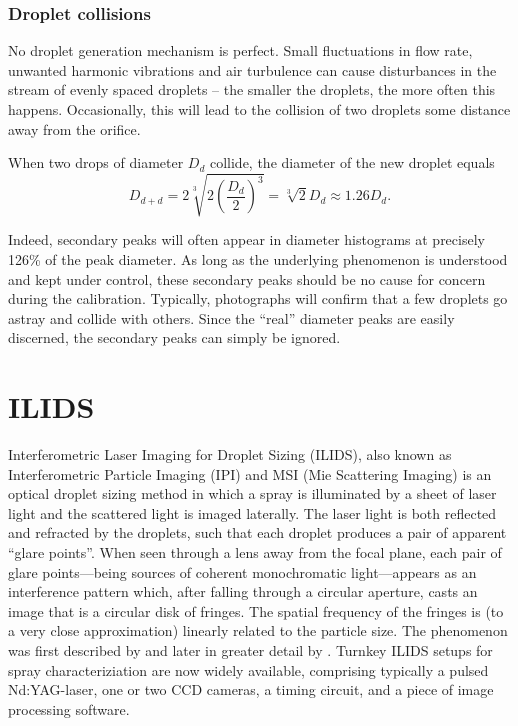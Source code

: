 \documentclass[11.5pt,oneside]{book}
\begin{document}
\subsection{Droplet collisions}
\label{sec:droplet-collisions}
No droplet generation mechanism is perfect. Small fluctuations in flow rate,
unwanted harmonic vibrations and air turbulence can cause disturbances in the
stream of evenly spaced droplets -- the smaller the droplets, the more often
this happens. Occasionally, this will lead to the collision
of two droplets some distance away from the orifice.

When two drops of diameter $D_d$ collide, the diameter of the new droplet equals
\begin{equation}
    D_{d+d} = 2\sqrt[3]{2\left(\frac{D_d}{2}\right)^3} = \sqrt[3]{2} D_d \approx
    1.26 D_d.
\end{equation}

Indeed, secondary peaks will often appear in diameter histograms at precisely 126\% of
the peak diameter. As long as the underlying phenomenon is understood and kept
under control, these secondary peaks should be no cause for concern during the
calibration. Typically, photographs will confirm that a few droplets go astray
and collide with others. Since the ``real'' diameter peaks are easily discerned,
the secondary peaks can simply be ignored.

\chapter[ILIDS]{ILIDS}
Interferometric Laser Imaging for Droplet Sizing (ILIDS), also known as
Interferometric Particle Imaging (IPI) and MSI (Mie Scattering Imaging) is an
optical droplet sizing method in which a spray is illuminated by a sheet of
laser light and the scattered light is imaged laterally. The laser light is both
reflected and refracted by the droplets, such that each droplet produces a pair
of apparent ``glare points''. When seen through a lens away from the focal
plane, each pair of glare points---being sources of coherent monochromatic
light---appears as an interference pattern which, after falling through a
circular aperture, casts an image that is a circular disk of fringes.  The
spatial frequency of the fringes is (to a very close approximation) linearly
related to the particle size. The phenomenon was first described by
\citet{Konig86} and later in greater detail by \citet{Glover95}. Turnkey ILIDS
setups for spray characteriziation are now widely available, comprising
typically a pulsed Nd:YAG-laser, one or two CCD cameras, a timing circuit, and a
piece of image processing software.
\end{document}
